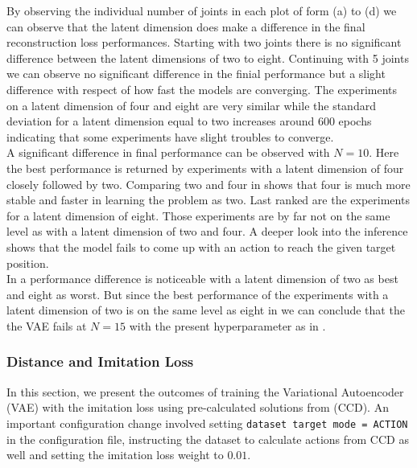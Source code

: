 By observing the individual number of joints in each plot of  form (a) to (d) we can observe that the latent dimension does make a difference in the final reconstruction loss performances. Starting with two joints there is no significant difference between the latent dimensions of two to eight. Continuing with 5 joints we can observe no significant difference in the finial performance but a slight difference with respect of how fast the models are converging. The experiments on a latent dimension of four and eight are very similar while the standard deviation for a latent dimension equal to two increases around 600 epochs indicating that some experiments have slight troubles to converge. \\
A significant difference in final performance can be observed with $N = 10$. Here the best performance is returned by experiments with a latent dimension of four closely followed by two. Comparing two and four in  shows that four is much more stable and faster in learning the problem as two. Last ranked are the experiments for a latent dimension of eight. Those experiments are by far not on the same level as with a latent dimension of two and four. A deeper look into the inference shows that the model fails to come up with an action to reach the given target position.\\
In  a performance difference is noticeable with a latent dimension of two as best and eight as worst. But since the best performance of the experiments with a latent dimension of two is on the same level as eight in  we can conclude that the the VAE fails at $N = 15$ with the present hyperparameter as in .

\subsubsection{Distance and Imitation Loss}


In this section, we present the outcomes of training the Variational Autoencoder (VAE) with the imitation loss using pre-calculated solutions from  (CCD). An important configuration change involved setting \texttt{dataset target mode = ACTION} in the configuration file, instructing the dataset to calculate actions from CCD as well and setting the imitation loss weight to $0.01$.

